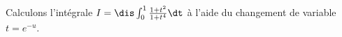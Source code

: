 \documentclass[a4paper,10pt]{report}
\begin{document}
\medskip

\begin{ex} Calculons l'intégrale $I=\dis \int_{0}^1 \frac{1+t^2}{1+t^4} \dt$ à l'aide du changement de variable $t=e^{-u}$.

\vspace{7cm}
%
\end{ex}

\newpage

$\phantom{test}$
\end{document}
